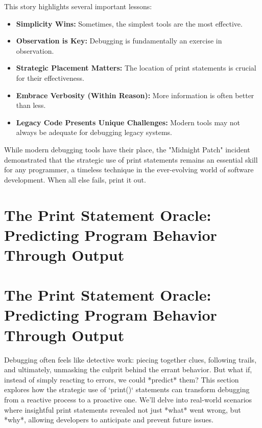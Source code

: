 \documentclass{article}
\begin{document}
{{{{This story highlights several important lessons:

\begin{itemize}
    \item \textbf{Simplicity Wins:} Sometimes, the simplest tools are the most effective.
    \item \textbf{Observation is Key:} Debugging is fundamentally an exercise in observation.
    \item \textbf{Strategic Placement Matters:} The location of print statements is crucial for their effectiveness.
    \item \textbf{Embrace Verbosity (Within Reason):} More information is often better than less.
    \item \textbf{Legacy Code Presents Unique Challenges:} Modern tools may not always be adequate for debugging legacy systems.
\end{itemize}

While modern debugging tools have their place, the "Midnight Patch" incident demonstrated that the strategic use of print statements remains an essential skill for any programmer, a timeless technique in the ever-evolving world of software development. When all else fails, print it out.

\newpage

\section*{The Print Statement Oracle: Predicting Program Behavior Through Output} %
\label{chapter-8-10-The_Print_Statement_Oracle__Predicting_P}

\section*{The Print Statement Oracle: Predicting Program Behavior Through Output}

Debugging often feels like detective work: piecing together clues, following trails, and ultimately, unmasking the culprit behind the errant behavior. But what if, instead of simply reacting to errors, we could *predict* them? This section explores how the strategic use of `print()` statements can transform debugging from a reactive process to a proactive one. We'll delve into real-world scenarios where insightful print statements revealed not just *what* went wrong, but *why*, allowing developers to anticipate and prevent future issues.

}}}}
\end{document}
